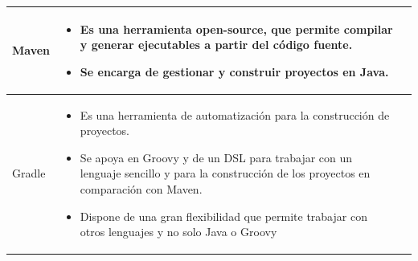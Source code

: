 \newpage
\begin{table}[b!]
\centering
\begin{tabular}{|p{2cm}|ll}
        \hline
          \multicolumn{1}{|p{5cm}|}{Maven}& 
          \multicolumn{1}{p{10cm}|}{
          \begin{itemize}
          \vspace{5mm}
          \item Es una herramienta open-source, que permite compilar y generar ejecutables a partir del código fuente.
          \item Se encarga de gestionar y construir proyectos en Java.

      \end{itemize}} \\
\hline
            \multicolumn{1}{|p{5cm}|}{Gradle}& 
          \multicolumn{1}{p{10cm}|}{
          \begin{itemize}
          \vspace{5mm}
          \item Es una herramienta de automatización para la construcción
                de proyectos.
          \item Se apoya en Groovy y de un DSL  para trabajar con un lenguaje sencillo y para la construcción de  los proyectos en comparación con Maven.
          \item Dispone de una gran flexibilidad que permite trabajar con otros
              lenguajes y no solo Java o Groovy
      \end{itemize}} \\
      \hline
      \end{tabular}
    \end{table}

   